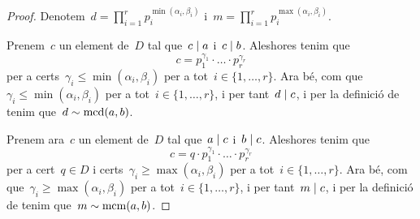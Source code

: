 \documentclass[../estructures-algebraiques.tex]{subfiles}
\begin{document}
    \begin{proof}
        Denotem~\(d=\prod_{i=1}^{r}p_{i}^{\min(\alpha_{i},\beta_{i})}\) i~\(m=\prod_{i=1}^{r}p_{i}^{\max(\alpha_{i},\beta_{i})}\).

        Prenem~\(c\) un element de~\(D\) tal que~\(c\mathrel{|} a\) i~\(c\mathrel{|} b\).
        Aleshores tenim que
        \[
            c=p_{1}^{\gamma_{1}}\cdot\ldots\cdot p_{r}^{\gamma_{r}}
        \]
        per a certs~\(\gamma_{i}\leq\min(\alpha_{i},\beta_{i})\) per a tot~\(i\in\{1,\dots,r\}\).
        Ara bé, com que~\(\gamma_{i}\leq\min(\alpha_{i},\beta_{i})\) per a tot~\(i\in\{1,\dots,r\}\), i per tant~\(d\mathrel{|} c\), i per la definició de  tenim que~\(d\sim\operatorname{mcd}(a,b)\).

        Prenem ara~\(c\) un element de~\(D\) tal que~\(a\mathrel{|} c\) i~\(b\mathrel{|} c\).
        Aleshores tenim que
        \[
            c=q\cdot p_{1}^{\gamma_{1}}\cdot\ldots\cdot p_{r}^{\gamma_{r}}
        \]
        per a cert~\(q\in D\) i certs~\(\gamma_{i}\geq\max(\alpha_{i},\beta_{i})\) per a tot~\(i\in\{1,\dots,r\}\).
        Ara bé, com que~\(\gamma_{i}\geq\max(\alpha_{i},\beta_{i})\) per a tot~\(i\in\{1,\dots,r\}\), i per tant~\(m\mathrel{|} c\), i per la definició de  tenim que~\(m\sim\operatorname{mcm}(a,b)\).
    \end{proof}
\end{document}
